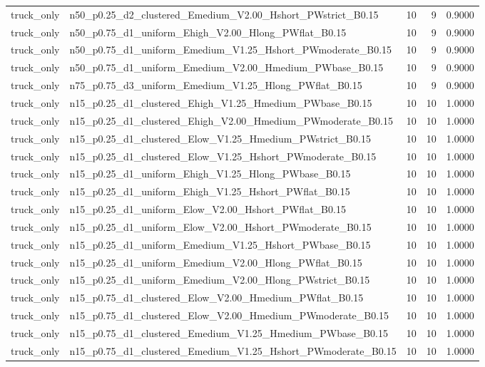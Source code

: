 \begin{tabular}{llrrr}
truck_only & n50_p0.25_d2_clustered_Emedium_V2.00_Hshort_PWstrict_B0.15 & 10 & 9 & 0.9000 \\
truck_only & n50_p0.75_d1_uniform_Ehigh_V2.00_Hlong_PWflat_B0.15 & 10 & 9 & 0.9000 \\
truck_only & n50_p0.75_d1_uniform_Emedium_V1.25_Hshort_PWmoderate_B0.15 & 10 & 9 & 0.9000 \\
truck_only & n50_p0.75_d1_uniform_Emedium_V2.00_Hmedium_PWbase_B0.15 & 10 & 9 & 0.9000 \\
truck_only & n75_p0.75_d3_uniform_Emedium_V1.25_Hlong_PWflat_B0.15 & 10 & 9 & 0.9000 \\
truck_only & n15_p0.25_d1_clustered_Ehigh_V1.25_Hmedium_PWbase_B0.15 & 10 & 10 & 1.0000 \\
truck_only & n15_p0.25_d1_clustered_Ehigh_V2.00_Hmedium_PWmoderate_B0.15 & 10 & 10 & 1.0000 \\
truck_only & n15_p0.25_d1_clustered_Elow_V1.25_Hmedium_PWstrict_B0.15 & 10 & 10 & 1.0000 \\
truck_only & n15_p0.25_d1_clustered_Elow_V1.25_Hshort_PWmoderate_B0.15 & 10 & 10 & 1.0000 \\
truck_only & n15_p0.25_d1_uniform_Ehigh_V1.25_Hlong_PWbase_B0.15 & 10 & 10 & 1.0000 \\
truck_only & n15_p0.25_d1_uniform_Ehigh_V1.25_Hshort_PWflat_B0.15 & 10 & 10 & 1.0000 \\
truck_only & n15_p0.25_d1_uniform_Elow_V2.00_Hshort_PWflat_B0.15 & 10 & 10 & 1.0000 \\
truck_only & n15_p0.25_d1_uniform_Elow_V2.00_Hshort_PWmoderate_B0.15 & 10 & 10 & 1.0000 \\
truck_only & n15_p0.25_d1_uniform_Emedium_V1.25_Hshort_PWbase_B0.15 & 10 & 10 & 1.0000 \\
truck_only & n15_p0.25_d1_uniform_Emedium_V2.00_Hlong_PWflat_B0.15 & 10 & 10 & 1.0000 \\
truck_only & n15_p0.25_d1_uniform_Emedium_V2.00_Hlong_PWstrict_B0.15 & 10 & 10 & 1.0000 \\
truck_only & n15_p0.75_d1_clustered_Elow_V2.00_Hmedium_PWflat_B0.15 & 10 & 10 & 1.0000 \\
truck_only & n15_p0.75_d1_clustered_Elow_V2.00_Hmedium_PWmoderate_B0.15 & 10 & 10 & 1.0000 \\
truck_only & n15_p0.75_d1_clustered_Emedium_V1.25_Hmedium_PWbase_B0.15 & 10 & 10 & 1.0000 \\
truck_only & n15_p0.75_d1_clustered_Emedium_V1.25_Hshort_PWmoderate_B0.15 & 10 & 10 & 1.0000 \\

\end{tabular}
